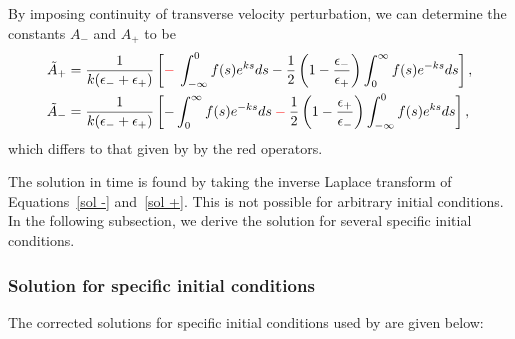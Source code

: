 \documentclass[12pt]{../style-files/ociamthesis}
\begin{document}
By imposing continuity of transverse velocity perturbation, we can determine the constants $A_-$ and $A_+$ to be
\begin{align}
\tilde{A}_+ & = \frac{1}{k(\epsilon_- + \epsilon_+)}\left[\textcolor{red}{-} \: \int_{-\infty}^0 f(s)e^{ks} ds - \frac{1}{2}\left(1 - \frac{\epsilon_-}{\epsilon_+}\right)\int_0^\infty f(s)e^{-ks} ds\right], \\
\tilde{A}_- & = \frac{1}{k(\epsilon_- + \epsilon_+)}\left[-\int_0^\infty f(s)e^{-ks} ds \: \textcolor{red}{-} \: \frac{1}{2}\left(1 - \frac{\epsilon_+}{\epsilon_-}\right)\int_{-\infty}^0 f(s)e^{ks} ds\right],
\end{align}
which differs to that given by \cite{rae_etal81} by the red operators.

The solution in time is found by taking the inverse Laplace transform of Equations~\eqref{sol -} and~\eqref{sol +}. This is not possible for arbitrary initial conditions. In the following subsection, we derive the solution for several specific initial conditions.


\subsubsection{Solution for specific initial conditions}

The corrected solutions for specific initial conditions used by \cite{rae_etal81} are given below:
\end{document}
